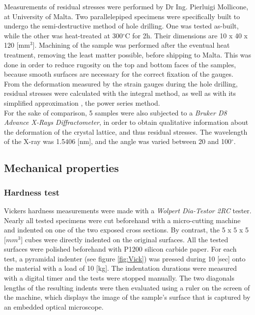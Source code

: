 Measurements of residual stresses were performed by Dr Ing. Pierluigi Mollicone, at University of Malta. Two parallelepiped specimens were specifically built to undergo the semi-destructive method of hole drilling. One was tested as-built, while the other was heat-treated at 300$^\circ$C for 2h. Their dimensions are 10 x 40 x 120 [mm$^3$]. Machining of the sample was performed after the eventual heat treatment, removing the least matter possible, before shipping to Malta. This was done in order to reduce rugosity on the top and bottom faces of the samples, because smooth surfaces are necessary for the correct fixation of the gauges. \\

From the deformation measured by the strain gauges during the hole drilling, residual stresses were calculated with the integral method, as well as with its simplified approximation \cite{Trebuna08}, the power series method.\\

For the sake of comparison, 5 samples were also subjected to a \textit{Bruker D8 Advance X-Rays Diffractometer}, in order to obtain qualitative information about the deformation of the crystal lattice, and thus residual stresses. The wavelength of the X-ray was 1.5406 [nm], and the angle was varied between 20 and 100$^\circ$.\\

\subsection{Mechanical properties}

\subsubsection{Hardness test}


Vickers hardness measurements were made with a \textit{Wolpert Dia-Testor 2RC} tester. Nearly all tested specimens were cut beforehand with a micro-cutting machine and indented on one of the two exposed cross sections. By contrast, the 5 x 5 x 5 [$mm^3$] cubes were directly indented on the original surfaces. All the tested surfaces were polished beforehand with P1200 silicon carbide paper. For each test, a pyramidal indenter (see figure \ref{fig:Vick}) was pressed during 10 [sec] onto the material with a load of 10 [kg]. The indentation durations were measured with a digital timer and the tests were stopped manually. The two diagonals lengths of the resulting indents were then evaluated using a ruler on the screen of the machine, which displays the image of the sample's surface that is captured by an embedded optical microscope.\\

